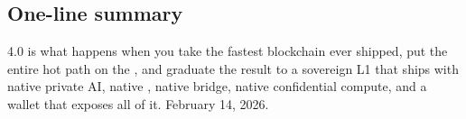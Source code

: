 \subsection{One-line summary}

\Zoo{} 4.0 is what happens when you take the fastest blockchain ever
shipped, put the entire hot path on the \GPU{}, and graduate the
result to a sovereign L1 that ships with native private AI, native
\AMM{}, native bridge, native confidential compute, and a wallet
that exposes all of it. February 14, 2026.
